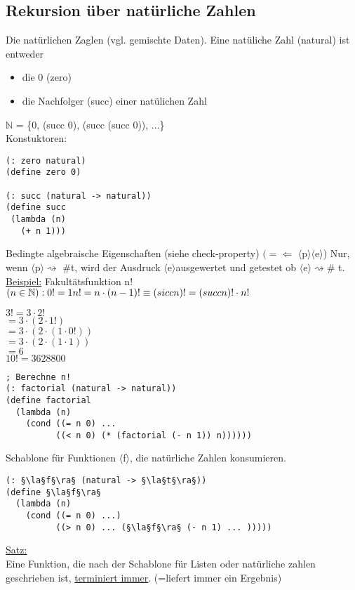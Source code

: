 \documentclass[a4paper,12pt]{article}
\newcommand{\la}{$\langle$}
\newcommand{\ra}{$\rangle$}
\begin{document}
\subsection{Rekursion über natürliche Zahlen}
Die natürlichen Zaglen (vgl. gemischte Daten).
Eine natüliche Zahl (natural) ist entweder
\begin{itemize}
\item die 0 (zero)
\item die Nachfolger (succ) einer natülichen Zahl
\end{itemize}
$\mathbb{N}$ = \{0, (succ 0), (succ (succ 0)), ...\}\\
Konstuktoren:
\begin{lstlisting}[style=customc]
(: zero natural)
(define zero 0)

(: succ (natural -> natural))
(define succ
 (lambda (n)
   (+ n 1)))
\end{lstlisting}
Bedingte algebraische Eigenschaften (siehe check-property)
$(=\Leftarrow$ \la p\ra \la e\ra)
Nur, wenn \la p\ra $\rightsquigarrow$ \#t, wird der Ausdruck \la e\ra ausgewertet und getestet ob \la e\ra$\rightsquigarrow$\# t.\\
\uline{Beispiel:} Fakultätsfunktion n! $(n\in \mathbb{N}):\\
0!=1\\
n! =n \cdot (n-1)! \equiv (sicc n)! = (succ n)!\cdot n!$
\begin{center}
$3! = 3 \cdot 2!$\\
$	= 3 \cdot (2 \cdot 1!)$\\
$   = 3 \cdot (2 \cdot (1 \cdot 0 !))$\\
$   = 3 \cdot (2 \cdot (1 \cdot 1))$\\
$   = 6$\\
$10!= 3628800$
\end{center}
\begin{lstlisting}[style=customc]
; Berechne n!
(: factorial (natural -> natural))
(define factorial
  (lambda (n)
    (cond ((= n 0) ...
          ((< n 0) (* (factorial (- n 1)) n))))))
\end{lstlisting}
Schablone für Funktionen \la f\ra, die natürliche Zahlen konsumieren.
\begin{lstlisting}[style=customc]
(: §\la§f§\ra§ (natural -> §\la§t§\ra§))
(define §\la§f§\ra§
  (lambda (n)
    (cond ((= n 0) ...)
		  ((> n 0) ... (§\la§f§\ra§ (- n 1) ... )))))
\end{lstlisting}
\uline{Satz:}\\
Eine Funktion, die nach der Schablone für Listen oder natürliche zahlen geschrieben ist, \uline{terminiert immer}. (=liefert immer ein Ergebnis)\\
\end{document}
